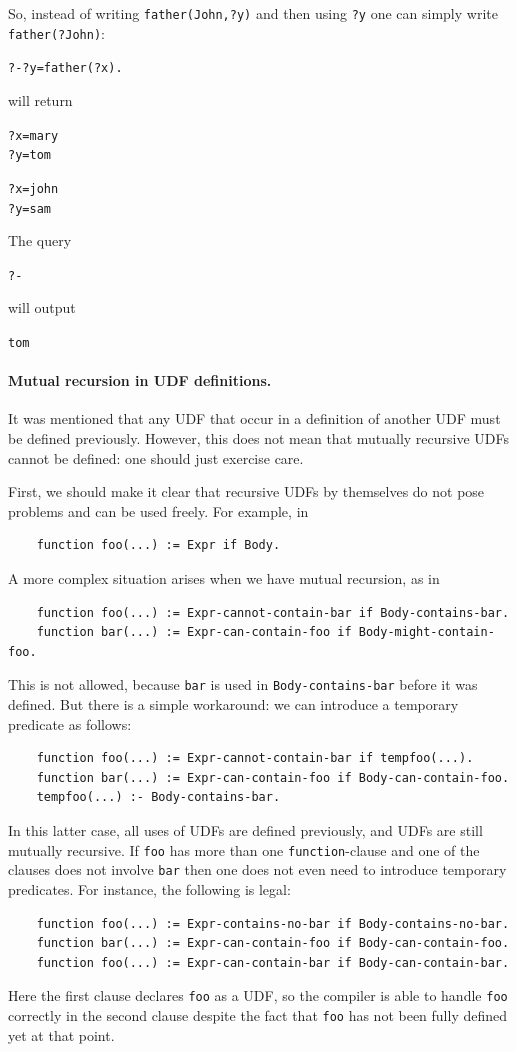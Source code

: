 \documentclass[11pt]{article}
\begin{document}
So, instead of writing \texttt{father(John,?y)}  and then using \texttt{?y}
one can simply write \texttt{father(?John)}:  
\begin{alltt}
    ?- ?y=father(?x).
\end{alltt}
will return
\begin{alltt}
    ?x=mary
    ?y=tom

    ?x=john
    ?y=sam
\end{alltt}
The query
\begin{alltt}
    ?- %
\end{alltt}
will output
\begin{alltt}
    tom
\end{alltt}

\paragraph{Mutual recursion in UDF definitions.}
It was mentioned that any UDF that occur in a definition of another UDF
must be defined previously. However, this does not mean that mutually
recursive UDFs cannot be defined: one should just exercise care.

First, we should make it clear that recursive UDFs by themselves do not
pose problems and can be used freely.  For example, in
\begin{verbatim}
    function foo(...) := Expr if Body.
\end{verbatim}
A more complex situation arises when we have mutual recursion, as in
\begin{verbatim}
    function foo(...) := Expr-cannot-contain-bar if Body-contains-bar.
    function bar(...) := Expr-can-contain-foo if Body-might-contain-foo.
\end{verbatim}
This is not allowed, because \texttt{bar} is used in
\texttt{Body-contains-bar} before it was defined.
But there is a simple workaround: we can introduce a
temporary predicate as follows:
\begin{verbatim}
    function foo(...) := Expr-cannot-contain-bar if tempfoo(...).
    function bar(...) := Expr-can-contain-foo if Body-can-contain-foo.
    tempfoo(...) :- Body-contains-bar.
\end{verbatim}
In this latter case, all uses of UDFs are defined previously, and UDFs are
still mutually recursive. If \texttt{foo} has more than one
\texttt{function}-clause and one of the clauses does not involve
\texttt{bar} then one does not even need to introduce temporary predicates. For
instance, the following is legal:   
\begin{verbatim}
    function foo(...) := Expr-contains-no-bar if Body-contains-no-bar.
    function bar(...) := Expr-can-contain-foo if Body-can-contain-foo.
    function foo(...) := Expr-can-contain-bar if Body-can-contain-bar.
\end{verbatim}
Here the first clause declares \texttt{foo} as a UDF, so the compiler is
able to handle \texttt{foo} correctly in the second clause despite the fact
that \texttt{foo} has not been fully defined yet at that point. 
\end{document}
